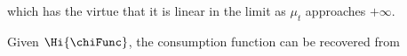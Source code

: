 which has the virtue that it is linear in the limit as $\mu_{t}$ approaches $+\infty$.

Given $\Hi{\chiFunc}$, the consumption function can be recovered from
